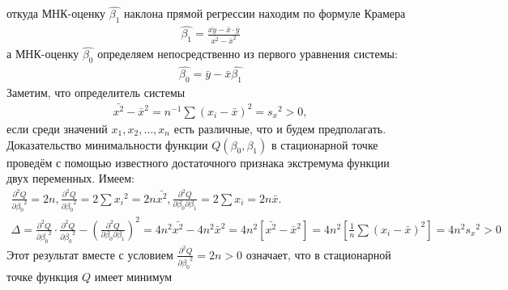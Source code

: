         откуда МНК-оценку $\hat{\beta_1}$ наклона прямой регрессии находим по формуле Крамера
         \begin{gather}
             \hat{\beta_1} = \frac{\bar{xy} - \bar{x}\cdot\bar{y}}{\bar{x^2} - \bar{x}^2}
         \end{gather}
         а МНК-оценку $\hat{\beta_0}$ определяем непосредственно из первого уравнения системы:
         \begin{gather}
             \hat{\beta_0} = \bar{y} - \bar{x}\hat{\beta_1}
         \end{gather}
         Заметим, что определитель системы
         \begin{gather*}
             \bar{x^2} - \bar{x}^2 = n^{-1}\sum(x_i - \bar{x})^2 = {s_x}^2 > 0,
         \end{gather*}
         если среди значений $x_1, x_2, \dots, x_n$ есть различные, что и будем предполагать.\\
         Доказательство минимальности функции $Q(\beta_0,\beta_1)$ в стационарной точке проведём с помощью известного достаточного признака экстремума функции двух переменных. Имеем:
         \begin{gather*}
             \frac{\partial^2{Q}}{\partial{{\beta_0}^2}} = 2n, \frac{\partial^2{Q}}{\partial{{\beta_0}^2}} = 2\sum{{x_i}^2} = 2n\bar{x^2}, \frac{\partial^2{Q}}{\partial{{\beta_0}}\partial{{\beta_1}}} = 2\sum{x_i} = 2n\bar{x}.\\
             \Delta = \frac{\partial^2{Q}}{\partial{{\beta_0}^2}} \cdot \frac{\partial^2{Q}}{\partial{{\beta_0}^2}} - (\frac{\partial^2{Q}}{\partial{{\beta_0}}\partial{{\beta_1}}})^2 = 4n^2\bar{x^2} -4n^2{\bar{x}}^2 = 4n^2\left[\bar{x^2} - {\bar{x}}^2\right] = 4n^2\left[\frac{1}{n}\sum(x_i-\bar{x})^2 \right] = 4n^2{s_x}^2 > 0
         \end{gather*}
         Этот результат вместе с условием $\frac{\partial^2{Q}}{\partial{{\beta_0}^2}} = 2n > 0$ означает, что в стационарной точке функция $Q$ имеет минимум

